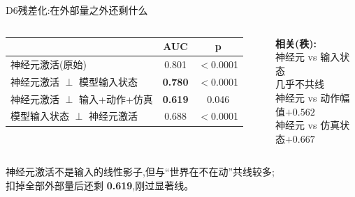 \documentclass[aspectratio=169,10pt]{beamer}
\newcommand{\hi}[1]{{\color{teai}\bfseries #1}}
\newcommand{\dimm}[1]{{\footnotesize\color{mute}#1}}
\begin{document}
\begin{frame}{D6\quad 残差化:在外部量之外还剩什么}
  \small
  \begin{columns}[T]
      \begin{tabular}{@{}lcc@{}}
        \toprule
        & \textbf{AUC} & \textbf{p} \\ \midrule
        神经元激活(原始) & 0.801 & $<$0.0001 \\
        神经元激活 $\perp$ 模型输入状态 & \hi{0.780} & $<$0.0001 \\
        神经元激活 $\perp$ 输入+动作+仿真 & \hi{0.619} & 0.046 \\
        模型输入状态 $\perp$ 神经元激活 & 0.688 & $<$0.0001 \\ \bottomrule
      \end{tabular}
      \textbf{相关(秩):}\\[3pt]
      神经元 vs 输入状态\quad \hi{$+0.208$}\\
      \dimm{几乎不共线}\\[3pt]
      神经元 vs 动作幅值\quad $+0.562$\\
      神经元 vs 仿真状态\quad $+0.667$
  \end{columns}
  \vfill
  \begin{center}\small
  神经元激活不是输入的线性影子,但与“世界在不在动”共线较多;\\
  扣掉全部外部量后还剩 \hi{0.619},刚过显著线。
  \end{center}
\end{frame}
\end{document}
